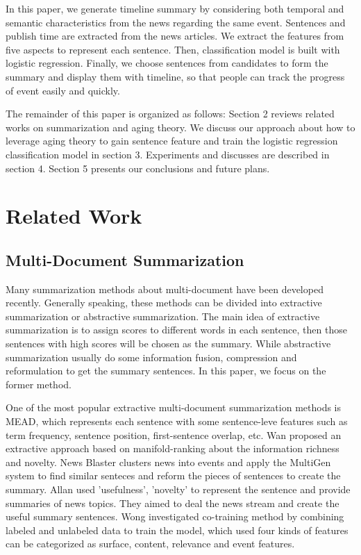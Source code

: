 \documentclass[print]{jicspack}
\begin{document}
In this paper, we generate timeline summary by considering both temporal and semantic characteristics from the news regarding the same event.
Sentences and publish time are extracted from the news articles. 
We extract the features from five aspects to represent each sentence. 
Then, classification model is built with logistic regression. 
Finally, we choose sentences from candidates to form the summary and display them with timeline, so that people can track the progress of event easily and quickly.

The remainder of this paper is organized as follows: Section 2 reviews related works on summarization and aging theory. 
We discuss our approach about how to leverage aging theory to gain sentence feature and train the logistic regression classification model in section 3. 
Experiments and discusses are described in section 4. 
Section 5 presents our conclusions and future plans.


\section{Related Work}

\subsection{Multi-Document Summarization}

Many summarization methods about multi-document have been developed recently. 
Generally speaking, these methods can be divided into extractive summarization or abstractive summarization.
The main idea of extractive summarization is to assign scores to different words in each sentence, then those sentences with high scores will be chosen as the summary.
While abstractive summarization usually do some information fusion\cite{barzilay1999information}, compression\cite{2002-Knight-p91-107} and reformulation\cite{mckeown1999towards} to get the summary sentences.
In this paper, we focus on the former method.

One of the most popular extractive multi-document summarization methods is MEAD\cite{2004-Radev-p919-938}, which represents each sentence with some sentence-leve features such as term frequency, sentence position, first-sentence overlap, etc. 
Wan\cite{wan2007manifold} proposed an extractive approach based on manifold-ranking about the information richness and novelty.
News Blaster\cite{McKeown2003} clusters news into events and apply the MultiGen system to find similar senteces and reform the pieces of sentences to create the summary.
Allan\cite{2001-Allan-p10-18} used 'usefulness', 'novelty' to represent the sentence and provide summaries of news topics. 
They aimed to deal the news stream and create the useful summary sentences.
Wong\cite{2008-Wong-p985-992} investigated co-training method by combining labeled and unlabeled data to train the model, which used four kinds of features can be categorized as surface, content, relevance and event features.
\end{document}
